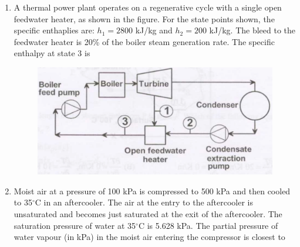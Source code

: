 \documentclass[journal,12pt,onecolumn]{IEEEtran}
\begin{document}
\begin{enumerate}
    \item A thermal power plant operates on a regenerative cycle with a single open feedwater heater, as shown in the figure. For the state points shown, the specific enthaplies are: $h_1 = 2800$ kJ/kg and $h_2 = 200$ kJ/kg. The bleed to the feedwater heater is 20\% of the boiler steam generation rate. The specific enthalpy at state 3 is

          \begin{figure}[H]
              \centering
              \includegraphics[scale=0.3]{q52}
              \caption{}
              \label{q52}
          \end{figure}

          \begin{enumerate}
          \end{enumerate}

    \item Moist air at a pressure of 100 kPa is compressed to 500 kPa and then cooled to 35$^\circ$C in an aftercooler. The air at the entry to the aftercooler is unsaturated and becomes just saturated at the exit of the aftercooler. The saturation pressure of water at 35$^\circ$C is 5.628 kPa. The partial pressure of water vapour (in kPa) in the moist air entering the compressor is closest to\\

          \begin{enumerate}
          \end{enumerate}


\end{enumerate}
\end{document}

